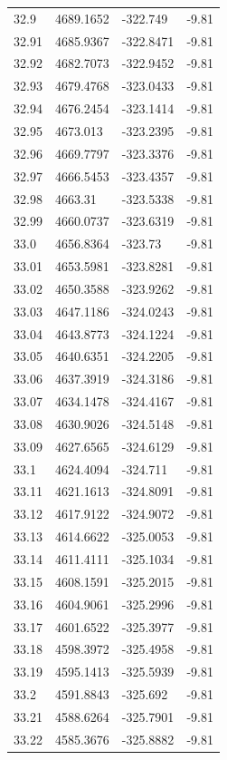 \begin{table}[H]
\begin{tabular}{llll}
32.9 & 4689.1652 & -322.749 & -9.81 \\
32.91 & 4685.9367 & -322.8471 & -9.81 \\
32.92 & 4682.7073 & -322.9452 & -9.81 \\
32.93 & 4679.4768 & -323.0433 & -9.81 \\
32.94 & 4676.2454 & -323.1414 & -9.81 \\
32.95 & 4673.013 & -323.2395 & -9.81 \\
32.96 & 4669.7797 & -323.3376 & -9.81 \\
32.97 & 4666.5453 & -323.4357 & -9.81 \\
32.98 & 4663.31 & -323.5338 & -9.81 \\
32.99 & 4660.0737 & -323.6319 & -9.81 \\
33.0 & 4656.8364 & -323.73 & -9.81 \\
33.01 & 4653.5981 & -323.8281 & -9.81 \\
33.02 & 4650.3588 & -323.9262 & -9.81 \\
33.03 & 4647.1186 & -324.0243 & -9.81 \\
33.04 & 4643.8773 & -324.1224 & -9.81 \\
33.05 & 4640.6351 & -324.2205 & -9.81 \\
33.06 & 4637.3919 & -324.3186 & -9.81 \\
33.07 & 4634.1478 & -324.4167 & -9.81 \\
33.08 & 4630.9026 & -324.5148 & -9.81 \\
33.09 & 4627.6565 & -324.6129 & -9.81 \\
33.1 & 4624.4094 & -324.711 & -9.81 \\
33.11 & 4621.1613 & -324.8091 & -9.81 \\
33.12 & 4617.9122 & -324.9072 & -9.81 \\
33.13 & 4614.6622 & -325.0053 & -9.81 \\
33.14 & 4611.4111 & -325.1034 & -9.81 \\
33.15 & 4608.1591 & -325.2015 & -9.81 \\
33.16 & 4604.9061 & -325.2996 & -9.81 \\
33.17 & 4601.6522 & -325.3977 & -9.81 \\
33.18 & 4598.3972 & -325.4958 & -9.81 \\
33.19 & 4595.1413 & -325.5939 & -9.81 \\
33.2 & 4591.8843 & -325.692 & -9.81 \\
33.21 & 4588.6264 & -325.7901 & -9.81 \\
33.22 & 4585.3676 & -325.8882 & -9.81 \\

\end{tabular}
\end{table}
